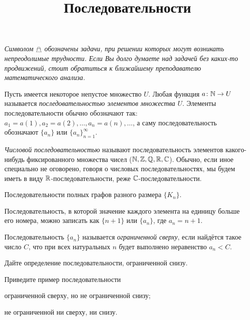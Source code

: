 \documentclass[a4paper, 12pt, num=24, date=06.11.2019]{listok}
\begin{document}
\title{Последовательности}
\maketitle{}
\begin{center}
    \textit{Символом $\mathghost$ обозначены задачи, при решении которых могут возникать непреодолимые трудности.
    Если Вы долго думаете над задачей без каких-то продвижений, стоит обратиться к ближайшему преподавателю математического анализа.}
\end{center}
\begin{definition}
    Пусть имеется некоторое непустое множество $U$.
    Любая функция $a \colon \mathbb{N} \to U$ называется \textit{последовательностью элементов множества $U$}.
    Элементы последовательности обычно обозначают так: $a_1 = a(1), a_2 = a(2), \ldots, a_n = a(n), \ldots$,
    а саму последовательность обозначают $\{a_n\}$ или ${\{a_n\}}_{n = 1}^{\infty}$.
\end{definition}
\begin{definition}
    \textit{Числовой последовательностью} называют последовательность элементов какого-нибудь фиксированного множества чисел ($\mathbb{N}, \mathbb{Z}, \mathbb{Q}, \mathbb{R}, \mathbb{C}$).
    Обычно, если иное специально не оговорено, говоря о числовых последовательностях, мы будем иметь в виду $\mathbb{R}$-последовательности, реже $\mathbb{C}$-последовательности.
\end{definition}
\begin{example}
    Последовательности полных графов разного размера $\{K_n\}$.
\end{example}
\begin{example}
    Последовательность, в которой значение каждого элемента на единицу больше его номера,
    можно записать как $\{n + 1\}$ или $\{a_n\}$, где $a_n = n + 1$.
\end{example}
\begin{definition}
    Последовательность $\{a_n\}$ называется \textit{ограниченной сверху}, если найдётся такое число $C$,
    что при всех натуральных $n$ будет выполнено неравенство $a_n < C$.
\end{definition}
\begin{problem}
    Дайте определение последовательности, ограниченной снизу.
\end{problem}
\begin{problem}
    Приведите пример последовательности
    \begin{probparts}
        \item ограниченной сверху, но не ограниченной снизу;
        \item не ограниченной ни сверху, ни снизу.
    \end{probparts}
\end{problem}
\end{document}
